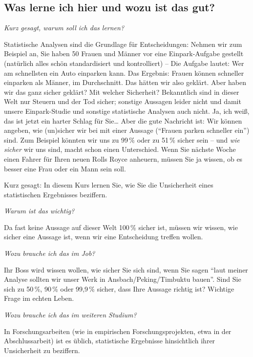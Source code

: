 \documentclass[
  ngerman,
  letterpaper,
  twoside,
  open=any]{scrbook}
\theoremstyle{definition}
\theoremstyle{plain}
\theoremstyle{definition}
\theoremstyle{definition}
\theoremstyle{definition}
\theoremstyle{definition}
\theoremstyle{remark}
\begin{document}
\subsection{Was lerne ich hier und wozu ist das
gut?}\label{was-lerne-ich-hier-und-wozu-ist-das-gut}

\emph{Kurz gesagt, warum soll ich das lernen?}

Statistische Analysen sind die Grundlage für Entscheidungen: Nehmen wir
zum Beispiel an, Sie haben 50 Frauen und Männer vor eine Einpark-Aufgabe
gestellt (natürlich alles schön standardisiert und kontrolliert) -- Die
Aufgabe lautet: Wer am schnellsten ein Auto einparken kann. Das
Ergebnis: Frauen können schneller einparken als Männer, im Durchschnitt.
Das hätten wir also geklärt. Aber haben wir das ganz sicher geklärt? Mit
welcher Sicherheit? Bekanntlich sind in dieser Welt nur Steuern und der
Tod sicher; sonstige Aussagen leider nicht und damit unsere
Einpark-Studie und sonstige statistische Analysen auch nicht. Ja, ich
weiß, das ist jetzt ein harter Schlag für Sie\ldots{} Aber die gute
Nachricht ist: Wir können angeben, wie (un)sicher wir bei mit einer
Aussage (\enquote{Frauen parken schneller ein}) sind. Zum Beispiel
könnten wir uns zu 99\,\% oder zu 51\,\% sicher sein -- und \emph{wie
sicher} wir uns sind, macht schon einen Unterschied. Wenn Sie nächste
Woche einen Fahrer für Ihren neuen Rolls Royce anheuern, müssen Sie ja
wissen, ob es besser eine Frau oder ein Mann sein soll.

Kurz gesagt: In diesem Kurs lernen Sie, wie Sie die Unsicherheit eines
statistischen Ergebnisses beziffern.

\emph{Warum ist das wichtig?}

Da fast keine Aussage auf dieser Welt 100\,\% sicher ist, müssen wir
wissen, wie sicher eine Aussage ist, wenn wir eine Entscheidung treffen
wollen.

\emph{Wozu brauche ich das im Job?}

Ihr Boss wird wissen wollen, wie sicher Sie sich sind, wenn Sie sagen
\enquote{laut meiner Analyse sollten wir unser Werk in
Ansbach/Peking/Timbuktu bauen}. Sind Sie sich zu 50\,\%, 90\,\% oder
99,9\,\% sicher, dass Ihre Aussage richtig ist? Wichtige Frage im echten
Leben.

\emph{Wozu brauche ich das im weiteren Studium?}

In Forschungsarbeiten (wie in empirischen Forschungsprojekten, etwa in
der Abschlussarbeit) ist es üblich, statistische Ergebnisse hinsichtlich
ihrer Unsicherheit zu beziffern.
\end{document}
